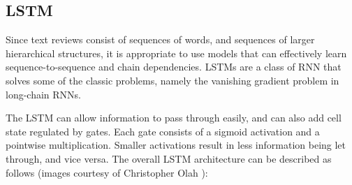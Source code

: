 \subsection{LSTM}
Since text reviews consist of sequences of words, and sequences of larger hierarchical structures, it is appropriate to use models that can effectively learn sequence-to-sequence and chain dependencies. LSTMs are a class of RNN that solves some of the classic problems, namely the vanishing gradient problem in long-chain RNNs.
\par 
The LSTM can allow information to pass through easily, and can also add cell state regulated by gates. Each gate consists of a sigmoid activation and a pointwise multiplication. Smaller activations result in less information being let through, and vice versa. The overall LSTM architecture can be described as follows (images courtesy of Christopher Olah \cite{olah_2015}):
